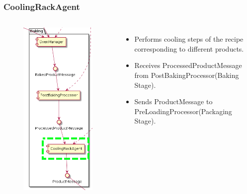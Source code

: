 \documentclass{beamer}
\begin{document}
\begin{frame}
    \frametitle{\huge{CoolingRackAgent}}
    \begin{columns}[t]
        \begin{figure}[H]
            \centering
            \includegraphics[width=0.6\linewidth]{baking_CoolingRackAgent.png}
        \end{figure}
            \begin{itemize}
                \item Performs cooling steps of the recipe corresponding to different products. 
                \item Receives ProcessedProductMessage from PostBakingProcessor(Baking Stage).
                \item Sends
ProductMessage to PreLoadingProcessor(Packaging Stage).
            \end{itemize}
    \end{columns}
\end{frame}
\end{document}
